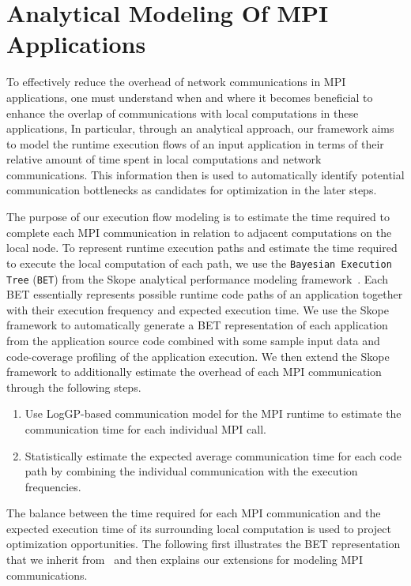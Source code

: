 \section{Analytical Modeling Of MPI Applications}
\label{sec-model}

To effectively reduce the overhead of network communications in MPI
applications, one must understand when and where it becomes beneficial
to enhance the overlap of communications with local computations in
these applications, In particular, through an analytical approach, our
framework aims to model the runtime execution flows of an input
application in terms of their relative amount of time spent in local
computations and network communications.  This information then is
used to automatically identify potential communication bottlenecks as
candidates for optimization in the later steps.

The purpose of our execution flow modeling is to estimate the time
required to complete each MPI communication in relation to adjacent
computations on the local node.  To represent runtime execution paths
and estimate the time required to execute the local computation of
each path, we use the \texttt{Bayesian Execution Tree} (\texttt{BET})
from the Skope analytical performance modeling
framework~\cite{jichi:ipdps14}.  Each BET essentially represents
possible runtime code paths of an application together with their
execution frequency and expected execution time. We use the Skope
framework to automatically generate a BET representation of each
application from the application source code combined with some sample
input data and code-coverage profiling of the application execution.
We then extend the Skope framework to additionally estimate the
overhead of each MPI communication through the following steps.

\begin{enumerate}

\item Use LogGP-based communication model for the MPI runtime to
  estimate the communication time for each individual MPI call.

\item Statistically estimate the expected average communication time
  for each code path by combining the individual communication with
  the execution frequencies.

\end{enumerate}

The balance between the time required for each MPI communication and
the expected execution time of its surrounding local computation is
used to project optimization opportunities. The following first
illustrates the BET representation that we inherit
from~\cite{jichi:ipdps14} and then explains our extensions for
modeling MPI communications.


